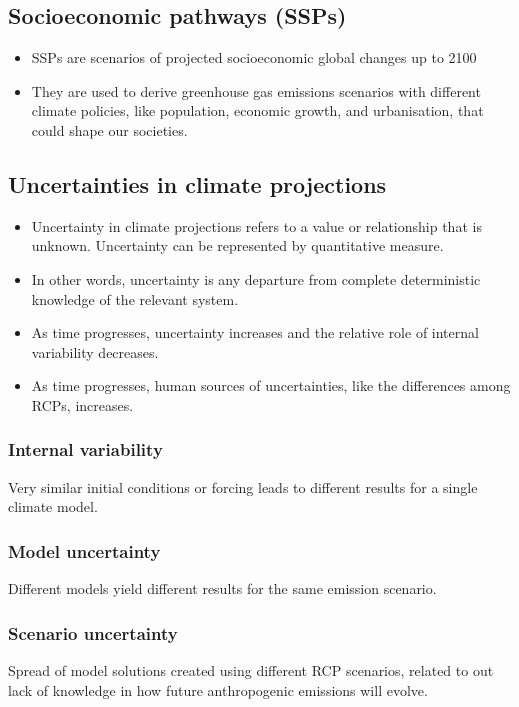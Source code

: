 \documentclass[11pt]{article}
\begin{document}
\subsection{Socioeconomic pathways (SSPs)}
\label{sec:orgc2e813e}
\begin{itemize}
\item SSPs are scenarios of projected socioeconomic global changes up to 2100
\item They are used to derive greenhouse gas emissions scenarios with different climate policies, like population, economic growth, and urbanisation, that could shape our societies.
\end{itemize}
\subsection{Uncertainties in climate projections}
\label{sec:org33a6405}
\begin{itemize}
\item Uncertainty in climate projections refers to a value or relationship that is unknown. Uncertainty can be represented by quantitative measure.
\item In other words, uncertainty is any departure from complete deterministic knowledge of the relevant system.
\item As time progresses, uncertainty increases and the relative role of internal variability decreases.
\item As time progresses, human sources of uncertainties, like the differences among RCPs, increases.
\end{itemize}
\subsubsection{Internal variability}
\label{sec:orgd3cac09}
Very similar initial conditions or forcing leads to different results for a single climate model.
\subsubsection{Model uncertainty}
\label{sec:org233639e}
Different models yield different results for the same emission scenario.
\subsubsection{Scenario uncertainty}
\label{sec:org6ca380f}
Spread of model solutions created using different RCP scenarios, related to out lack of knowledge in how future anthropogenic emissions will evolve.
\end{document}
